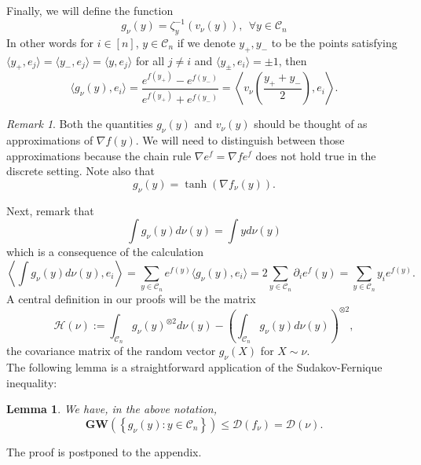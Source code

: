 \documentclass[12pt]{article}
\def \DC {\mathcal{C}_n}
\def \MW {\mathbf{GW}}
\def \HH {\mathcal{H}}
\def \Comp { \mathcal{D} }
\newtheorem{lemma}[theorem]{Lemma}
\theoremstyle{definition}
\theoremstyle{remark}
\newtheorem{remark}{Remark}
\begin{document}
Finally, we will define the function
\begin{equation}\label{eq:defgnu}
g_\nu(y) = \zeta_y^{-1}(v_\nu(y)), ~~ \forall y \in \DC
\end{equation}
In other words for $i \in [n]$, $y \in \DC$ if we denote $y_+,y_-$ to be the points satisfying $\langle y_+, e_j \rangle = \langle y_-, e_j \rangle = \langle y, e_j \rangle$ for all $j \neq i$ and $\langle y_{\pm}, e_i \rangle = \pm 1$, then
\begin{equation}\label{eq:defgp}
\langle g_\nu(y), e_i \rangle = \frac{e^{f(y_+)} - e^{f(y_-)} }{ e^{f(y_+)} + e^{f(y_-)} } = \left \langle v_\nu \left ( \frac{y_+ + y_-}{2} \right ), e_i \right \rangle.
\end{equation}

\begin{remark} \label{rmkder}
Both the quantities $g_\nu(y)$ and $v_\nu(y)$ should be thought of as approximations of $\nabla f(y)$. We will need to distinguish between those approximations because the chain rule $\nabla e^f = \nabla f e^f$ does not hold true in the discrete setting. Note also that
\begin{equation}\label{eq:tanh}
g_\nu(y) = \tanh(\nabla f_\nu(y)).
\end{equation}
\end{remark}
Next, remark that 
\begin{equation}\label{eq:gcom}
\int g_{\nu}(y) d \nu(y) = \int y d \nu(y)
\end{equation}
which is a consequence of the calculation
$$
\left \langle \int g_{\nu}(y) d \nu(y), e_i \right \rangle = \sum_{y \in \DC} e^{f(y)} \langle g_\nu(y), e_i \rangle = 2 \sum_{y \in \DC} \partial_i e^f (y) = \sum_{y \in \DC} y_i e^{f(y)}.
$$
A central definition in our proofs will be the matrix
$$
\HH(\nu) := \int_{\DC} g_{\nu}(y)^{\otimes 2} d \nu(y)  - \left ( \int_{\DC} g_{\nu}(y) d \nu(y) \right )^{\otimes 2},
$$
the covariance matrix of the random vector $g_\nu(X)$ for $X \sim \nu$. \\

The following lemma is a straightforward application of the Sudakov-Fernique inequality:
\begin{lemma} \label{lem:SF}
We have, in the above notation,
\begin{equation}\label{eq:SF}
\MW \left ( \left \{ g_\nu(y) : y \in \DC  \right \} \right ) \leq \Comp(f_\nu) = \Comp(\nu).
\end{equation}
\end{lemma}
\noindent The proof is postponed to the appendix. \\
\end{document}
